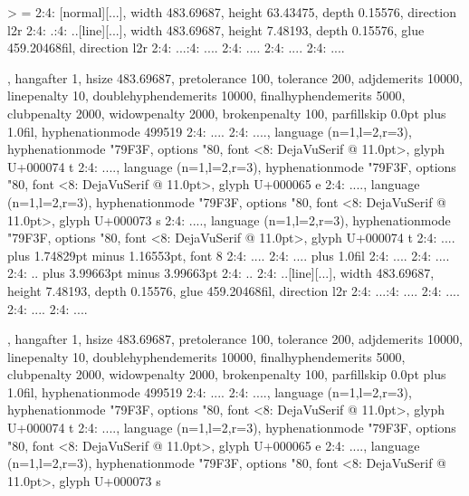 \start \switchtobodyfont[5pt]
\starttyping[option=TEX]
> =
2:4: \vbox[normal][...], width 483.69687, height 63.43475, depth 0.15576, direction l2r
2:4: .:4: ..\hbox[line][...], width 483.69687, height 7.48193, depth 0.15576, glue 459.20468fil, direction l2r
2:4: ...:4: ....
2:4: ....\glue[left][...] 0.0pt
2:4: ....\glue[parfillleft][...] 0.0pt
2:4: ....\par[newgraf][...], hangafter 1, hsize 483.69687, pretolerance 100, tolerance 200, adjdemerits 10000, linepenalty 10, doublehyphendemerits 10000, finalhyphendemerits 5000, clubpenalty 2000, widowpenalty 2000, brokenpenalty 100, parfillskip 0.0pt plus 1.0fil, hyphenationmode 499519
2:4: ....\glue[indent][...] 0.0pt
2:4: ....\glyph[32768][...], language (n=1,l=2,r=3), hyphenationmode "79F3F, options "80, font <8: DejaVuSerif @ 11.0pt>, glyph U+000074 t
2:4: ....\glyph[32768][...], language (n=1,l=2,r=3), hyphenationmode "79F3F, options "80, font <8: DejaVuSerif @ 11.0pt>, glyph U+000065 e
2:4: ....\glyph[32768][...], language (n=1,l=2,r=3), hyphenationmode "79F3F, options "80, font <8: DejaVuSerif @ 11.0pt>, glyph U+000073 s
2:4: ....\glyph[32768][...], language (n=1,l=2,r=3), hyphenationmode "79F3F, options "80, font <8: DejaVuSerif @ 11.0pt>, glyph U+000074 t
2:4: ....\glue[space][...] 3.49658pt plus 1.74829pt minus 1.16553pt, font 8
2:4: ....
2:4: ....\glue[parfill][...] 0.0pt plus 1.0fil
2:4: ....\glue[right][...] 0.0pt
2:4: ....
2:4: ..\glue[par][...] 11.98988pt plus 3.99663pt minus 3.99663pt
2:4: ..\glue[baseline][...] 8.34883pt
2:4: ..\hbox[line][...], width 483.69687, height 7.48193, depth 0.15576, glue 459.20468fil, direction l2r
2:4: ...:4: ....
2:4: ....\glue[left][...] 0.0pt
2:4: ....\glue[parfillleft][...] 0.0pt
2:4: ....\par[newgraf][...], hangafter 1, hsize 483.69687, pretolerance 100, tolerance 200, adjdemerits 10000, linepenalty 10, doublehyphendemerits 10000, finalhyphendemerits 5000, clubpenalty 2000, widowpenalty 2000, brokenpenalty 100, parfillskip 0.0pt plus 1.0fil, hyphenationmode 499519
2:4: ....\glue[indent][...] 0.0pt
2:4: ....\glyph[32768][...], language (n=1,l=2,r=3), hyphenationmode "79F3F, options "80, font <8: DejaVuSerif @ 11.0pt>, glyph U+000074 t
2:4: ....\glyph[32768][...], language (n=1,l=2,r=3), hyphenationmode "79F3F, options "80, font <8: DejaVuSerif @ 11.0pt>, glyph U+000065 e
2:4: ....\glyph[32768][...], language (n=1,l=2,r=3), hyphenationmode "79F3F, options "80, font <8: DejaVuSerif @ 11.0pt>, glyph U+000073 s
